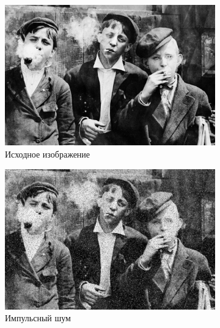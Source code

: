 \begin{figure}[ht] 
    \centering
    \begin{subfigure}[b]{0.5\linewidth}
        \centering
        \includegraphics[width=0.95\linewidth]{../lewis-hine-taschen-main-3.jpg} 
        \caption{Исходное изображение} 
        \label{wiener_3:a} 
        \vspace{4ex}
    \end{subfigure}%
    \begin{subfigure}[b]{0.5\linewidth}
      \centering
      \includegraphics[width=0.95\linewidth]{../Wiener_Filter/Wiener_Impulse_noise_(k=3).jpg} 
      \caption{Импульсный шум} 
      \label{weiner_3:b} 
      \vspace{4ex}
    \end{subfigure}
    \begin{subfigure}[b]{0.5\linewidth}
      \centering

\end{subfigure}
\end{figure}
